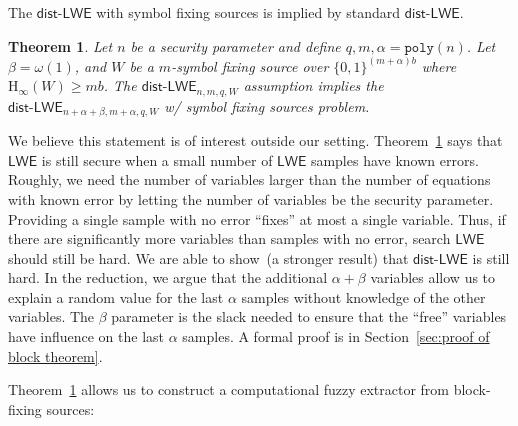 \documentclass[11pt]{article}
\newcommand{\secref}[1]{\mbox{Section~\ref{#1}}}
\newcommand{\thref}[1]{\mbox{Theorem~\ref{#1}}}
\newcommand{\class}[1]{{\ensuremath{\mathsf{#1}}}}
\newcommand{\zo}{\ensuremath{\{0, 1\}}}
\newcommand{\poly}{\ensuremath{\mathtt{poly}}\xspace}
\newcommand{\Hoo}{\mathrm{H}_\infty}
\newcommand{\LWE}{\class{LWE}}
\newcommand{\distLWE}{\ensuremath{\class{dist\mbox{-}LWE}}}
\newtheorem{theorem}{Theorem}[section]
\newcommand{\authnote}[2]{{\textcolor{red}{\textsf{#1 notes: }\textcolor{blue}{ #2}}\marginpar{\textcolor{red}{\textbf{!!!!!}}}}}
\newcommand{\authnote}[2]{}
\newcommand{\lnote}[1]{{\authnote{Leo}{#1}}}
\begin{document}
The $\distLWE$ with symbol fixing sources is implied by standard $\distLWE$.
\begin{theorem}
\label{thm:blockLWE}
Let $n$ be a security parameter and define $q, m , \alpha = \poly(n)$.  Let $\beta  = \omega(1)$, and $W$ be a $m$-symbol fixing source over $\{0,1\}^{(m+\alpha)b}$ where $\Hoo(W) \geq mb$.  The $\distLWE_{n, m,q, W}$ assumption implies the $\distLWE_{n+\alpha+\beta, m+\alpha, q, W}$ w/ symbol fixing sources problem.
\end{theorem}
We believe this statement is of interest outside our setting. \thref{thm:blockLWE} says that $\LWE$ is still secure when a small number of $\LWE$ samples have known errors.  Roughly, we need the number of variables larger than the number of equations with known error by letting the number of variables be the security parameter.  Providing a single sample with no error ``fixes'' at most a single variable.  Thus, if there are significantly more variables than samples with no error, search $\LWE$ should still be hard.  We are able to show~(a stronger result) that $\distLWE$ is still hard.  In the reduction, we argue that the additional $\alpha+ \beta$ variables allow us to explain a random value for the last $\alpha$ samples without knowledge of the other variables.  The $\beta$ parameter is the slack needed to ensure that the ``free'' variables have influence on the last $\alpha$ samples.  A formal proof is in \secref{sec:proof of block theorem}.


\thref{thm:blockLWE} allows us to construct a computational fuzzy extractor from block-fixing sources: 

\end{document}
